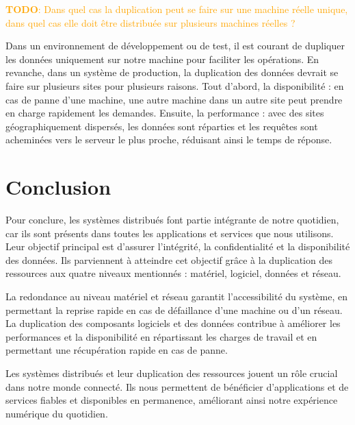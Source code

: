 \documentclass[a11paper, 11pt]{article}
\newcommand{\todo}[1]{\textcolor{orange}{\textbf{TODO}: #1}}
\begin{document}
\todo{Dans quel cas la duplication peut se faire sur une machine réelle unique, dans
quel cas elle doit être distribuée sur plusieurs machines réelles ?}

Dans un environnement de développement ou de test, il est courant de dupliquer les données uniquement sur notre machine pour faciliter les opérations. En revanche, dans un système de production, la duplication des données devrait se faire sur plusieurs sites pour plusieurs raisons. Tout d'abord, la disponibilité : en cas de panne d'une machine, une autre machine dans un autre site peut prendre en charge rapidement les demandes. Ensuite, la performance : avec des sites géographiquement dispersés, les données sont réparties et les requêtes sont acheminées vers le serveur le plus proche, réduisant ainsi le temps de réponse.

\section{Conclusion}
Pour conclure, les systèmes distribués font partie intégrante de notre quotidien, car ils sont présents dans toutes les applications et services que nous utilisons. Leur objectif principal est d'assurer l'intégrité, la confidentialité et la disponibilité des données. Ils parviennent à atteindre cet objectif grâce à la duplication des ressources aux quatre niveaux mentionnés : matériel, logiciel, données et réseau.

La redondance au niveau matériel et réseau garantit l'accessibilité du système, en permettant la reprise rapide en cas de défaillance d'une machine ou d'un réseau. La duplication des composants logiciels et des données contribue à améliorer les performances et la disponibilité en répartissant les charges de travail et en permettant une récupération rapide en cas de panne.

Les systèmes distribués et leur duplication des ressources jouent un rôle crucial dans notre monde connecté. Ils nous permettent de bénéficier d'applications et de services fiables et disponibles en permanence, améliorant ainsi notre expérience numérique du quotidien.

\end{document}
